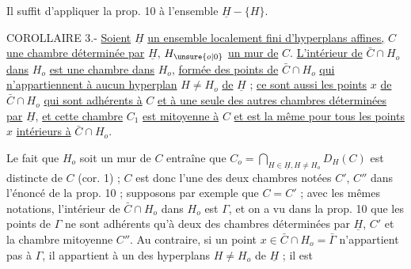 Il suffit d'appliquer la prop. 10 à l'ensemble $\underline{H}-\{H\}$.

COROLLAIRE 3.- \uline{Soient} $\underline{H}$ \uline{un ensemble localement fini d'hyperplans affines,} $C$ \uline{une chambre déterminée par} $\underline{H}$, $H_{\unsure{o|0}}$ \uline{un mur de} $C$. \uline{L'intérieur de} $\bar{C}\cap H_o$ \uline{dans} $H_o$ \uline{est une chambre dans} $H_o$, \uline{formée des points de} $\bar{C}\cap H_o$ \uline{qui n'appartiennent à aucun hyperplan} $H\ne H_o$ \uline{de} $\underline{H}$ ; \uline{ce sont aussi les points} $x$ \uline{de} $\bar{C}\cap H_o$ \uline{qui sont adhérents à} $C$ \uline{et à une seule des autres chambres déterminées par} $\underline{H}$, \uline{et cette chambre} $C_1$ \uline{est mitoyenne à} $C$ \uline{et est la même pour tous les points} $x$ \uline{intérieurs à} $\bar{C}\cap H_o$.

Le fait que $H_o$ soit un mur de $C$ entraîne que $C_o=\bigcap\limits_{H\in\underline{H},H\ne H_o}D_H(C)$ est distincte de $C$ (cor. 1) ; $C$ est donc l'une des deux chambres notées $C'$, $C''$ dans l'énoncé de la prop. 10 ; supposons par exemple que $C=C'$ ; avec les mêmes notations, l'intérieur de $\bar{C}\cap H_o$ dans $H_o$ est $\Gamma$, et on a vu dans la prop. 10 que les points de $\Gamma$ ne sont adhérents qu'à deux des chambres déterminées par $\underline{H}$, $C'$ et la chambre mitoyenne $C''$. Au contraire, si un point $x\in\bar{C}\cap H_o=\bar{\Gamma}$ n'appartient pas à $\Gamma$, il appartient à un des hyperplans $H\ne H_o$ de $\underline{H}$ ; il est
